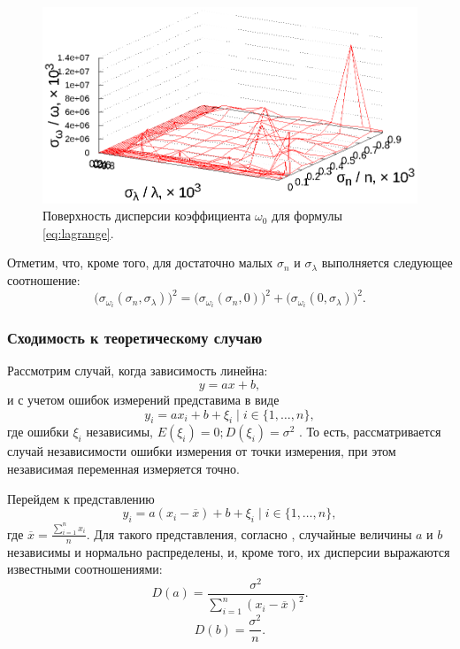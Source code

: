 \documentclass[12pt,a4paper]{article}
\begin{document}
\begin{figure}[h]
  \centering
  \includegraphics[scale=1.2]{figs/lagrange/p1.txt_coeff0.dat.eps}
  \caption{Поверхность дисперсии коэффициента $\omega_0$ для формулы \eqref{eq:lagrange}.}
  \label{fig:lagrange_i_0}
\end{figure}

Отметим, что, кроме того, для достаточно малых $\sigma_n$ и $\sigma_\lambda$ выполняется
следующее соотношение:
\[
  \big(\sigma_{\omega_i}(\sigma_n, \sigma_{\lambda})\big)^2 =
  	\big(\sigma_{\omega_i}(\sigma_n, 0)\big)^2 +
  	  \big(\sigma_{\omega_i}(0, \sigma_{\lambda})\big)^2.
\]

\subsubsection{Сходимость к теоретическому случаю}

Рассмотрим случай, когда зависимость линейна:
\[
  y = ax + b,
\]
и с учетом ошибок измерений представима в виде
\[
  y_i = ax_i + b + \xi_i \mid i \in \{ 1, \dots, n \},
\]
где ошибки $\xi_i$ независимы, $E(\xi_i) = 0; D(\xi_i) = \sigma^2$ \cite{Vatunin05}.
То есть, рассматривается случай независимости ошибки измерения от точки измерения,
при этом независимая переменная измеряется точно.

Перейдем к представлению
\[
  y_i = a(x_i - \overline{x}) + b + \xi_i \mid i \in \{ 1, \dots, n \},
\]
где $\overline{x} = \frac{\sum_{i = 1}^n x_i}{n}$. Для такого представления,
согласно \cite{Vatunin05}, случайные величины $a$ и $b$ независимы
и нормально распределены, и, кроме того, их дисперсии выражаются известными соотношениями:
\begin{equation}
  \label{eq:classic_da}
  D(a) = \frac{\sigma^2}{\sum_{i = 1}^n (x_i - \overline{x})^2}.
\end{equation}
\begin{equation}
  \label{eq:classic_db}
  D(b) = \frac{\sigma^2}{n}.
\end{equation}
\end{document}
